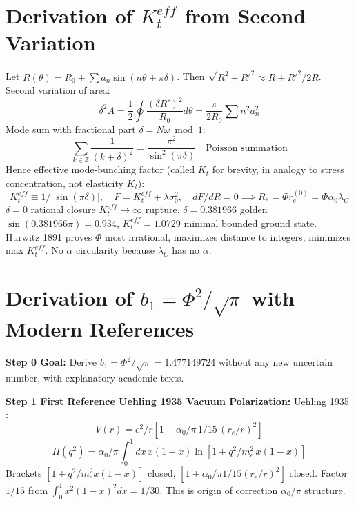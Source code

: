 \documentclass[11pt,a4paper]{article}
\begin{document}
\section{Derivation of \texorpdfstring{$K_t^{eff}$}{Kt eff} from Second Variation}
Let $R(\theta)=R_0+\sum a_n\sin(n\theta+\pi\delta)$. Then $\sqrt{R^2+R'^2}\approx R+R'^2/2R$. Second variation of area:
\begin{equation} \delta^2A=\frac12\oint\frac{(\delta R')^2}{R_0}d\theta=\frac{\pi}{2R_0}\sum n^2a_n^2 \end{equation}
Mode sum with fractional part $\delta=N\omega\bmod1$:
\begin{equation} \sum_{k\in\mathbb{Z}}\frac1{(k+\delta)^2}=\frac{\pi^2}{\sin^2(\pi\delta)}\quad\text{Poisson summation} \end{equation}
Hence effective mode-bunching factor (called $K_t$ for brevity, in analogy to stress concentration, not elasticity $K_t$):
\begin{equation} K_t^{eff}\equiv1/|\sin(\pi\delta)|,\quad F=K_t^{eff}+\lambda\sigma_0^2,\quad dF/dR=0\implies R_*=\Phi r_e^{(0)}=\Phi\alpha_0\lambda_C \end{equation}
$\delta=0$ rational closure $K_t^{eff}\to\infty$ rupture, $\delta=0.381966$ golden $\sin(0.381966\pi)=0.934$, $K_t^{eff}=1.0729$ minimal bounded ground state. Hurwitz 1891 proves $\Phi$ most irrational, maximizes distance to integers, minimizes max $K_t^{eff}$. No $\alpha$ circularity because $\lambda_C$ has no $\alpha$.

\section{Derivation of \texorpdfstring{$b_1=\Phi^2/\sqrt{\pi}$}{b1=Phi^2/sqrt(pi)} with Modern References}

\textbf{Step 0 Goal:} Derive $b_1=\Phi^2/\sqrt{\pi}=1.477149724$ without any new uncertain number, with explanatory academic texts.

\textbf{Step 1 First Reference Uehling 1935 Vacuum Polarization:}
Uehling 1935 \cite{Uehling1935}:
\begin{equation} V(r)=e^2/r\left[1+\alpha_0/\pi\,1/15\,(r_e/r)^2\right] \end{equation}
\begin{equation} \Pi(q^2)=\alpha_0/\pi\int_0^1dx\,x(1-x)\ln\left[1+q^2/m_e^2\,x(1-x)\right] \end{equation}
Brackets $[1+q^2/m_e^2x(1-x)]$ closed, $[1+\alpha_0/\pi1/15(r_e/r)^2]$ closed. Factor $1/15$ from $\int_0^1x^2(1-x)^2dx=1/30$. This is origin of correction $\alpha_0/\pi$ structure.
\end{document}

